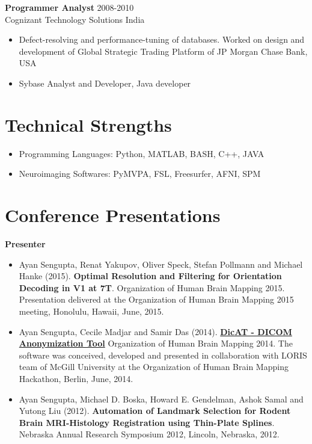 \documentclass[line, margin]{res}
\begin{document}
\begin{resume}
\textbf{Programmer Analyst} \hfill 2008-2010\\
Cognizant Technology Solutions \hfill India\\

\begin{itemize}
    \item Defect-resolving and performance-tuning of databases. Worked on design and development of Global Strategic Trading Platform of JP Morgan Chase Bank, USA
    \item Sybase Analyst and Developer, Java developer
\end{itemize}


\section{Technical Strengths}
\begin{itemize}
    \item Programming Languages: Python, MATLAB, BASH, C++, JAVA
    \item Neuroimaging Softwares: PyMVPA, FSL, Freesurfer, AFNI, SPM
\end{itemize}


\section{Conference Presentations}
\textbf{Presenter}
\begin{itemize}
    \item Ayan Sengupta, Renat Yakupov, Oliver Speck, Stefan Pollmann and Michael Hanke (2015). \textbf{Optimal Resolution and Filtering for Orientation Decoding in V1 at 7T}. Organization of Human Brain Mapping 2015.  Presentation delivered at the Organization of Human Brain Mapping 2015 meeting, Honolulu, Hawaii, June, 2015. 

    \item Ayan Sengupta, Cecile Madjar and Samir Das (2014). \href{https://github.com/aces/DICOM_anonymizer/blob/master/README.md}{\textbf{DicAT - DICOM Anonymization Tool}} Organization of Human Brain Mapping 2014. The software was conceived, developed and presented in collaboration with LORIS team of McGill University at the Organization of Human Brain Mapping Hackathon, Berlin, June, 2014.

    \item Ayan Sengupta, Michael D. Boska, Howard E. Gendelman, Ashok Samal and Yutong Liu (2012). \textbf{Automation of Landmark Selection for Rodent Brain MRI-Histology Registration using Thin-Plate Splines}. Nebraska Annual Research Symposium 2012, Lincoln, Nebraska, 2012. 


\end{itemize}
\end{resume}
\end{document}
